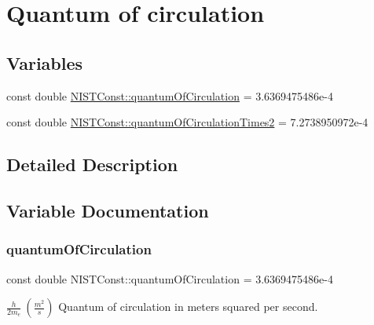 \hypertarget{group___n_i_s_t_const-_quantum_of_circulation}{}\section{Quantum of circulation}
\label{group___n_i_s_t_const-_quantum_of_circulation}
\subsection*{Variables}
\begin{DoxyCompactItemize}
\item 
const double \hyperlink{group___n_i_s_t_const-_quantum_of_circulation_ga7dbe55704b9a968adfc99d60f5d2dd11}{N\+I\+S\+T\+Const\+::quantum\+Of\+Circulation} = 3.\+6369475486e-\/4
\item 
const double \hyperlink{group___n_i_s_t_const-_quantum_of_circulation_ga86d150a3f178c37f565f6498cf593dbe}{N\+I\+S\+T\+Const\+::quantum\+Of\+Circulation\+Times2} = 7.\+2738950972e-\/4
\end{DoxyCompactItemize}


\subsection{Detailed Description}


\subsection{Variable Documentation}
\mbox{\label{group___n_i_s_t_const-_quantum_of_circulation_ga7dbe55704b9a968adfc99d60f5d2dd11}} 
\subsubsection{\texorpdfstring{quantum\+Of\+Circulation}{quantumOfCirculation}}
{\footnotesize\ttfamily const double N\+I\+S\+T\+Const\+::quantum\+Of\+Circulation = 3.\+6369475486e-\/4}

$\frac{h}{2 m_e} \ (\frac{m^2}{s})$ Quantum of circulation in meters squared per second. \mbox{\label{group___n_i_s_t_const-_quantum_of_circulation_ga86d150a3f178c37f565f6498cf593dbe}} 
